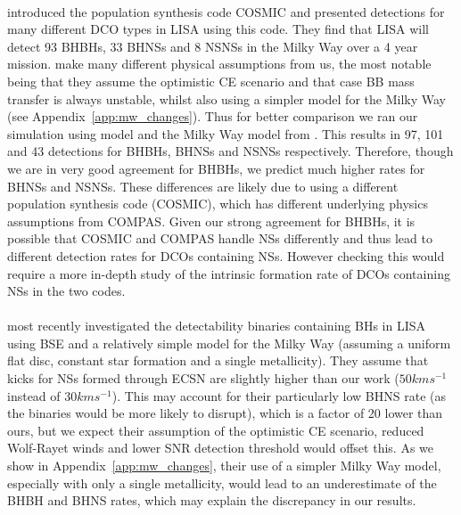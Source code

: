 \paragraph{\citet{Breivik+2020}} introduced the population synthesis code COSMIC and presented detections for many different DCO types in LISA using this code. They find that LISA will detect 93 BHBHs, 33 BHNSs and 8 NSNSs in the Milky Way over a 4 year mission. \citet{Breivik+2020} make many different physical assumptions from us, the most notable being that they assume the optimistic CE scenario and that case BB mass transfer is always unstable, whilst also using a simpler model for the Milky Way (see Appendix~\ref{app:mw_changes}). Thus for better comparison we ran our simulation using model \modCaseBBOpt{} and the Milky Way model from \citet{Breivik+2020}. This results in 97, 101 and 43 detections for BHBHs, BHNSs and NSNSs respectively. Therefore, though we are in very good agreement for BHBHs, we predict much higher rates for BHNSs and NSNSs. These differences are likely due to using a different population synthesis code (COSMIC), which has different underlying physics assumptions from COMPAS. Given our strong agreement for BHBHs, it is possible that COSMIC and COMPAS handle NSs differently and thus lead to different detection rates for DCOs containing NSs. However checking this would require a more in-depth study of the intrinsic formation rate of DCOs containing NSs in the two codes.

\paragraph{\citet{Shao+2021}} most recently investigated the detectability binaries containing BHs in LISA using BSE and a relatively simple model for the Milky Way (assuming a uniform flat disc, constant star formation and a single metallicity). They assume that kicks for NSs formed through ECSN are slightly higher than our work ($50 \unit{km}{s^{-1}}$ instead of $30 \unit{km}{s^{-1}}$). This may account for their particularly low BHNS rate (as the binaries would be more likely to disrupt), which is a factor of 20 lower than ours, but we expect their assumption of the optimistic CE scenario, reduced Wolf-Rayet winds and lower SNR detection threshold would offset this. As we show in Appendix~\ref{app:mw_changes}, their use of a simpler Milky Way model, especially with only a single metallicity, would lead to an underestimate of the BHBH and BHNS rates, which may explain the discrepancy in our results.
